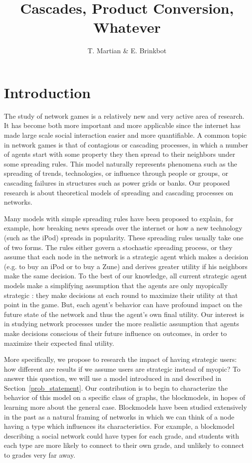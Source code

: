 \documentclass{article}
\title{Cascades, Product Conversion, Whatever}
\author{T. Martian \& E. Brinkbot}
\begin{document}
\maketitle

\section{Introduction}
\label{intro}

The study of network games is a relatively new and very active area of
research. It has become both more important and more applicable since
the internet has made large scale social interaction easier and more
quantifiable. A common topic in network games is that of contagious or
cascading processes, in which a number of agents start with some
property they then spread to their neighbors under some spreading
rules. This model naturally represents phenomena such as the spreading
of trends, technologies, or influence through people or groups, or
cascading failures in structures such as power grids or banks. Our
proposed research is about theoretical models of spreading and
cascading processes on networks.

Many models with simple spreading rules have been proposed
\cite{Arthur89, Morris00, Watts02} to explain, for example, how
breaking news spreads over the internet or how a new technology (such
as the iPod) spreads in popularity. These spreading rules usually take
one of two forms. The rules either govern a stochastic spreading
process, or they assume that each node in the network is a strategic
agent which makes a decision (e.g. to buy an iPod or to buy a Zune)
and derives greater utility if his neighbors make the same
decision. To the best of our knowledge, all current strategic agent
models make a simplifying assumption that the agents are only
myopically strategic \cite{Chierichetti12}: they make decisions at
each round to maximize their utility at that point in the game. But,
each agent's behavior can have profound impact on the future state of
the network and thus the agent's own final utility. Our interest is in
studying network processes under the more realistic assumption that
agents make decisions conscious of their future influence on outcomes,
in order to maximize their expected final utility.

More specifically, we propose to research the impact of having
strategic users: how different are results if we assume users are
strategic instead of myopic? To answer this question, we will use a
model introduced in \cite{Chierichetti12} and described in
Section~\ref{prob_statement}. Our contribution is to begin to
characterize the behavior of this model on a specific class of graphs,
the blockmodels, in hopes of learning more about the general
case. Blockmodels have been studied extensively in the past
\cite{Wang87, Snijders97} as a natural framing of networks in which we
can think of a node having a type which influences its
characteristics. For example, a blockmodel describing a social network
could have types for each grade, and students with each type are more
likely to connect to their own grade, and unlikely to connect to
grades very far away.
\end{document}
